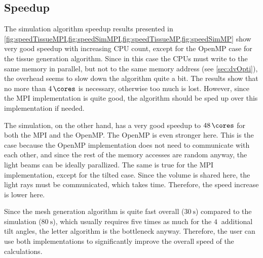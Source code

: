 \subsection{Speedup}
%
The simulation algorithm speedup results presented in \cref{fig:speedTissueMPI,fig:speedSimMPI,fig:speedTissueMP,fig:speedSimMP} show very good speedup with increasing \ac{CPU} count, except for the \ac{OpenMP} case for the tissue generation algorithm.
Since in this case the \acsp{CPU} must write to the same memory in parallel, but not to the same memory address (see \cref{sec:dvOpti}), the overhead seems to slow down the algorithm quite a bit.
The results show that no more than $\SI{4}{\cores}$ is necessary, otherwise too much \dummy{} is lost.
However, since the \ac{MPI} implementation is quite good, the algorithm should be sped up over this implementation if needed.
\par
%
The simulation, on the other hand, has a very good speedup to $\SI{48}{\cores}$ for both the \ac{MPI} and the \ac{OpenMP}.
The \ac{OpenMP} is even stronger here.
This is the case because the \ac{OpenMP} implementation does not need to communicate with each other, and since the rest of the memory accesses are random anyway, the light beams can be ideally parallized.
The same is true for the \ac{MPI} implementation, except for the tilted case.
Since the volume is shared here, the light rays must be communicated, which takes time.
Therefore, the speed increase is lower here.
\par
%
Since the mesh generation algorithm is quite fast overall ($\SI{30}{\second}$) compared to the simulation ($\SI{80}{\second}$), which usually requires five times as much for the $\SI{4}{}$ additional tilt angles, the letter algorithm is the bottleneck anyway.
Therefore, the user can use both implementations to significantly improve the overall speed of the calculations.